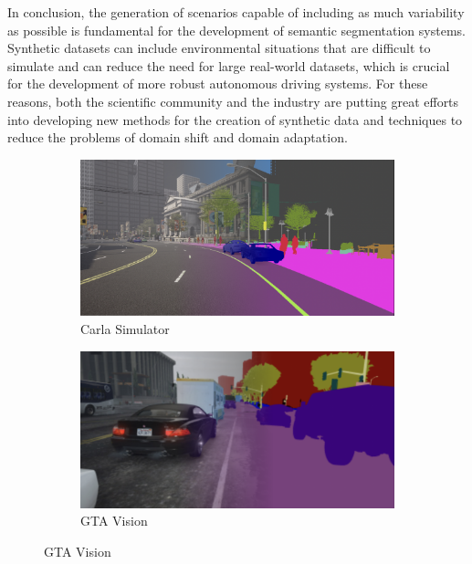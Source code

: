 In conclusion, the generation of scenarios capable of including as much variability as possible is fundamental for the development of semantic segmentation systems. Synthetic datasets can include environmental situations that are difficult to simulate and can reduce the need for large real-world datasets, which is crucial for the development of more robust autonomous driving systems. For these reasons, both the scientific community and the industry are putting great efforts into developing new methods for the creation of synthetic data and techniques to reduce the problems of domain shift and domain adaptation.


\begin{figure}
\centering
  \begin{subfigure}[b]{0.49\columnwidth}
    \includegraphics[width=\columnwidth]{img/2-related-work/carla_semantic_segmentation_overlay.png}
    \caption{Carla Simulator \cite{CarlaSimulator}}
    \label{fig:example-carla}
  \end{subfigure}
  \begin{subfigure}[b]{0.49\columnwidth}
    \includegraphics[width=\columnwidth]{img/2-related-work/gtav_semantic_segmentation_overlay_resized.png}
    \caption{GTA Vision \cite{gtav}}
    \label{fig:example-gta}
  \end{subfigure}


\end{figure}
